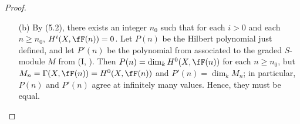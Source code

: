 \documentclass[a4paper]{article}
\begin{document}
\begin{enumerate} [label=\textbf{\arabic*.}, leftmargin=0em]
\begin{proof}
\begin{itemize} [leftmargin=0cm]
                  Assume the statement to be true for all coherent sheaves with suPort dimension less than $n$.
                  Consider the exact sequence
                  \[ \begin{tikzcd}
                      0 \arrow[r] & \fO_X(-1) \arrow[r, "x_r"] & \fO_X \arrow[r] & \fO_H \arrow[r] & 0,
                    \end{tikzcd} \]
                  where $H$ is the hyperplane $x_r = 0$.
                  Taking the tensor product of this sequence with $\fF$ gives us
                  \[ \begin{tikzcd}
                      0 \arrow[r] & \fR \arrow[r] & \fF(-1) \arrow[r] & \fF \arrow[r] & \fF_H \arrow[r] & 0,
                    \end{tikzcd} \]
                  where $\fR$ is the kernel of the map $\fF(-1) \to \fF$.
                  Twisting by $\fO_X(n)$ is exact, so we get
                  \begin{equation*}
                    \chi(\fF(n)) - \chi(\fF(n - 1)) = \chi(\fF_H(n)) - \chi(\fR(n))
                  \end{equation*}
                  by (III, Ex. 5.1).
                  Consider the coherent $\fO_X$-module $\fR$. It vanishes under the multiplication map $x_r$, where $x_r$ locally defines one of the coordinates such that $x_r = 0$  is the defining equation for $H$, and such that there is a inclusion $\Supp{\fR} \subseteq H$, which exists by Bertini's theorem.
                  Since $H \cong \P^{r - 1}_k$, we can apply the induction hypothesis to $\fR$ and $\fF_H$, so let $P_\fR(z), P_{\fF_H}(z) \in \Q[z]$ be polynomials such that
                  \begin{equation*}
                    \chi(\fR(n)) = P_\fR(n), \quad \chi(\fF_H(n)) = P_{\fF_H}(n).
                  \end{equation*}
                  The difference function of $\chi(\fF(n))$ is equal to $P_{\fF_H}(z) - P_{\fR}(n) \in \Q[z]$, so by (, 7.3), we conclude that $\chi(\fF(n)) = P(n)$ for some $P(z) \in \Q[z]$.

            \item[(b)] By (5.2), there exists an integer $n_0$ such that for each $i > 0$ and each $n \geq n_0$, $H^i(X, \fF(n)) = 0$.
                  Let $P(n)$ be the Hilbert polynomial just defined, and let $P'(n)$ be the polynomial from associated to the graded $S$-module $M$ from (I, ).
                  Then $P(n) = \dim_k H^0(X, \fF(n))$ for each $n \geq n_0$, but $M_n = \Gamma(X, \fF(n)) = H^0(X, \fF(n))$ and $P'(n) = \dim_k M_n$; in particular, $P(n)$ and $P'(n)$ agree at infinitely many values.
                  Hence, they must be equal.
          \end{itemize}
        \end{proof}


\end{enumerate}
\end{document}
